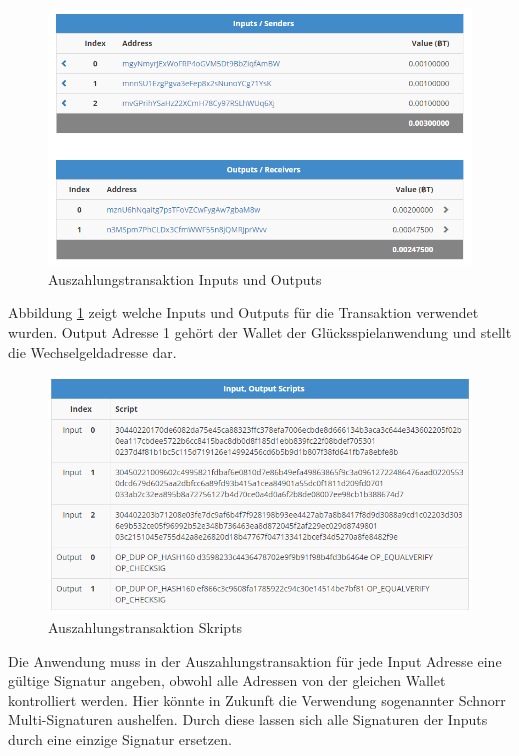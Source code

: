 \begin{figure}[H]
\centering
\includegraphics[width=1\linewidth]{Figures/btc_gui/btc_txn_input_output}
\decoRule
\caption{Auszahlungstransaktion Inputs und Outputs}
\label{fig:btc_txn_input_output}
\end{figure}


\noindent Abbildung \ref{fig:btc_txn_input_output} zeigt welche Inputs und Outputs für die Transaktion verwendet wurden. Output Adresse 1 gehört der Wallet der Glücksspielanwendung und stellt die Wechselgeldadresse dar.


\begin{figure}[H]
\centering
\includegraphics[width=1\linewidth]{Figures/btc_gui/btc_txn_input_output_scripts}
\decoRule
\caption{Auszahlungstransaktion Skripts}
\label{fig:btc_txn_input_output_scripts}
\end{figure}

Die Anwendung muss in der Auszahlungstransaktion für jede Input Adresse eine gültige Signatur angeben, obwohl alle Adressen von der gleichen Wallet kontrolliert werden. Hier könnte in Zukunft die Verwendung sogenannter Schnorr Multi-Signaturen \cite{schnorr_sig} aushelfen. Durch diese lassen sich alle Signaturen der Inputs durch eine einzige Signatur ersetzen.

